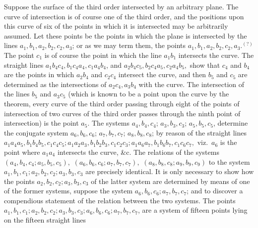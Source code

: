 \documentclass[11pt]{article}
\begin{document}
Suppose the surface of the third order intersected by an arbitrary plane. The curve of intersection is of course one of the third order, and the positions upon this curve of six of the points in which it is intersected may be arbitrarily assumed. Let these points be the points in which the plane is intersected by the lines $a_1, b_1, a_2, b_2, c_2, a_3$; or as we may term them, the points $a_1, b_1, a_2, b_2, c_2, a_3$.$^{(?)}$ The point $c_1$ is of course the point in which the line $a_1 b_1$ intersects the curve. The straight lines $a_1 b_4 c_4, b_1 c_4 a_4, c_1 a_4 b_4$, and $a_2 b_4 c_5, b_2 c_4 a_5, c_2 a_4 b_5,$ show that $c_4$ and $b_4$ are the points in which $a_2 b_4$ and $c_2 c_4$ intersect the curve, and then $b_5$ and $c_5$ are determined as the intersections of $a_2 c_4, a_3 b_4$ with the curve. The intersection of the lines $b_5$ and $a_3 c_5$ (which is known to be a point upon the curve by the theorem, every curve of the third order passing through eight of the points of intersection of two curves of the third order passes through the ninth point of intersection) is the point $a_5$. The systems $a_4, b_4, c_4$; $a_3, b_3, c_3$; $a_5, b_5, c_5$, determine the conjugate system $a_6, b_6, c_6$; $a_7, b_7, c_7$; $a_8, b_8, c_8$; by reason of the straight lines $a_1 a_4 a_5, b_1 b_4 b_5, c_1 c_4 c_5; a_1 a_2 a_3, b_1 b_2 b_3, c_1 c_2 c_3; a_1 a_6 a_7, b_1 b_6 b_7, c_1 c_6 c_7,$ viz.\ $a_6$ is the point where $a_1 a_4$ intersects the curve, \&c. The relations of the systems $(a_4, b_4, c_4; a_5, b_5, c_5),$ $(a_6, b_6, c_6; a_7, b_7, c_7),$ $(a_8, b_8, c_8; a_9, b_9, c_9)$ to the system $a_1, b_1, c_1; a_2, b_2, c_2; a_3, b_3, c_3$ are precisely identical. It is only necessary to show how the points $a_2, b_2, c_2; a_3, b_3, c_3$ of the latter system are determined by means of one of the former systems, suppose the system $a_6, b_6, c_6; a_7, b_7, c_7$; and to discover a compendious statement of the relation between the two systems. The points $a_1, b_1, c_1; a_2, b_2, c_2; a_3, b_3, c_3; a_6, b_6, c_6; a_7, b_7, c_7$, are a system of fifteen points lying on the fifteen straight lines
\end{document}
